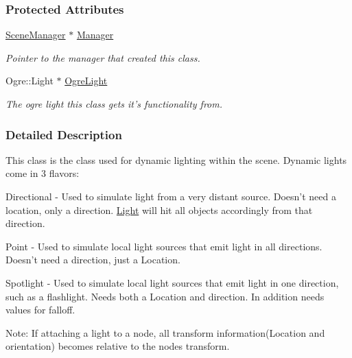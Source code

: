 \subsubsection*{Protected Attributes}
\begin{DoxyCompactItemize}
\item 
\hypertarget{classMezzanine_1_1Light_a33af923976c32b2a34aaae8549ed35e4}{
\hyperlink{classMezzanine_1_1SceneManager}{SceneManager} $\ast$ \hyperlink{classMezzanine_1_1Light_a33af923976c32b2a34aaae8549ed35e4}{Manager}}
\label{classMezzanine_1_1Light_a33af923976c32b2a34aaae8549ed35e4}

\begin{DoxyCompactList}\small\item\em Pointer to the manager that created this class. \item\end{DoxyCompactList}\item 
\hypertarget{classMezzanine_1_1Light_a228f1f22dbee36bed47894086d2191ff}{
Ogre::Light $\ast$ \hyperlink{classMezzanine_1_1Light_a228f1f22dbee36bed47894086d2191ff}{OgreLight}}
\label{classMezzanine_1_1Light_a228f1f22dbee36bed47894086d2191ff}

\begin{DoxyCompactList}\small\item\em The ogre light this class gets it's functionality from. \item\end{DoxyCompactList}\end{DoxyCompactItemize}


\subsubsection{Detailed Description}
This class is the class used for dynamic lighting within the scene. Dynamic lights come in 3 flavors: \par
 Directional -\/ Used to simulate light from a very distant source. Doesn't need a location, only a direction. \hyperlink{classMezzanine_1_1Light}{Light} will hit all objects accordingly from that direction. \par
 Point -\/ Used to simulate local light sources that emit light in all directions. Doesn't need a direction, just a Location. \par
 Spotlight -\/ Used to simulate local light sources that emit light in one direction, such as a flashlight. Needs both a Location and direction. In addition needs values for falloff. \par
 Note: If attaching a light to a node, all transform information(Location and orientation) becomes relative to the nodes transform. 

